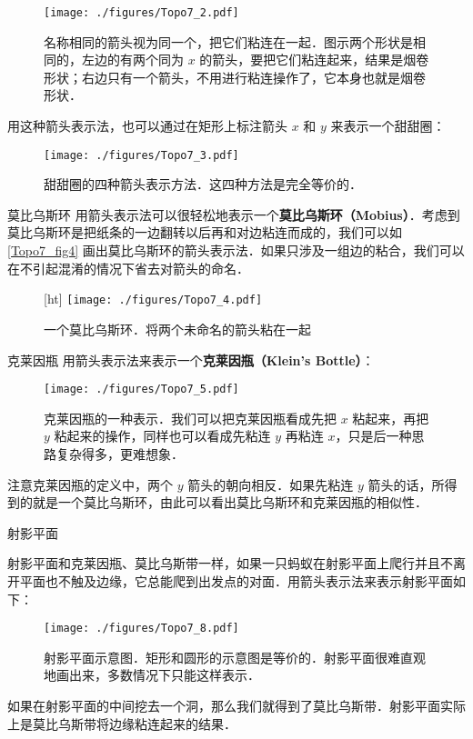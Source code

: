 \begin{figure}[ht]
\centering
\texttt{[image: ./figures/Topo7\_2.pdf]}
\caption{名称相同的箭头视为同一个，把它们粘连在一起．图示两个形状是相同的，左边的有两个同为 $x$ 的箭头，要把它们粘连起来，结果是烟卷形状；右边只有一个箭头，不用进行粘连操作了，它本身也就是烟卷形状．} \label{Topo7_fig2}
\end{figure}

用这种箭头表示法，也可以通过在矩形上标注箭头 $x$ 和 $y$ 来表示一个甜甜圈：

\begin{figure}[ht]
\centering
\texttt{[image: ./figures/Topo7\_3.pdf]}
\caption{甜甜圈的四种箭头表示方法．这四种方法是完全等价的．} \label{Topo7_fig3}
\end{figure}

\begin{example}{莫比乌斯环}
用箭头表示法可以很轻松地表示一个\textbf{莫比乌斯环（Mobius）}．考虑到莫比乌斯环是把纸条的一边翻转以后再和对边粘连而成的，我们可以如\autoref{Topo7_fig4} 画出莫比乌斯环的箭头表示法．如果只涉及一组边的粘合，我们可以在不引起混淆的情况下省去对箭头的命名．

\begin{figure}\label{Topo7_fig6}[ht]
\centering
\texttt{[image: ./figures/Topo7\_4.pdf]}
\caption{一个莫比乌斯环．将两个未命名的箭头粘在一起} \label{Topo7_fig4}
\end{figure}

\end{example}



\begin{example}{克莱因瓶}
用箭头表示法来表示一个\textbf{克莱因瓶（Klein's Bottle）}：
\begin{figure}[ht]
\centering
\texttt{[image: ./figures/Topo7\_5.pdf]}
\caption{克莱因瓶的一种表示．我们可以把克莱因瓶看成先把 $x$ 粘起来，再把 $y$ 粘起来的操作，同样也可以看成先粘连 $y$ 再粘连 $x$，只是后一种思路复杂得多，更难想象．} \label{Topo7_fig5}
\end{figure}

注意克莱因瓶的定义中，两个 $y$ 箭头的朝向相反．如果先粘连 $y$ 箭头的话，所得到的就是一个莫比乌斯环，由此可以看出莫比乌斯环和克莱因瓶的相似性．

\end{example}

\begin{example}{射影平面}

射影平面和克莱因瓶、莫比乌斯带一样，如果一只蚂蚁在射影平面上爬行并且不离开平面也不触及边缘，它总能爬到出发点的对面．用箭头表示法来表示射影平面如下：

\begin{figure}[ht]
\centering
\texttt{[image: ./figures/Topo7\_8.pdf]}
\caption{射影平面示意图．矩形和圆形的示意图是等价的．射影平面很难直观地画出来，多数情况下只能这样表示．} \label{Topo7_fig8}
\end{figure}

如果在射影平面的中间挖去一个洞，那么我们就得到了莫比乌斯带．射影平面实际上是莫比乌斯带将边缘粘连起来的结果．

\end{example}

